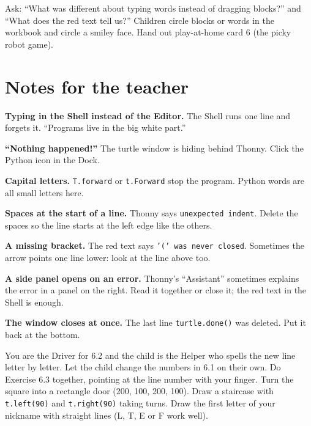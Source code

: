 \begin{reflection}
Ask: \enquote{What was different about typing words instead of dragging blocks?} and \enquote{What does the red text tell us?} Children circle blocks or words in the workbook and circle a smiley face. Hand out play-at-home card 6 (the picky robot game).
\end{reflection}

\section{Notes for the teacher}
\begin{commonmistakes}
  \item \textbf{Typing in the Shell instead of the Editor.} The Shell runs one line and forgets it. \enquote{Programs live in the big white part.}
  \item \textbf{\enquote{Nothing happened!}} The turtle window is hiding behind Thonny. Click the Python icon in the Dock.
  \item \textbf{Capital letters.} \texttt{T.forward} or \texttt{t.Forward} stop the program. Python words are all small letters here.
  \item \textbf{Spaces at the start of a line.} Thonny says \texttt{unexpected indent}. Delete the spaces so the line starts at the left edge like the others.
  \item \textbf{A missing bracket.} The red text says \texttt{'(' was never closed}. Sometimes the arrow points one line lower: look at the line above too.
  \item \textbf{A side panel opens on an error.} Thonny's \enquote{Assistant} sometimes explains the error in a panel on the right. Read it together or close it; the red text in the Shell is enough.
  \item \textbf{The window closes at once.} The last line \texttt{turtle.done()} was deleted. Put it back at the bottom.
\end{commonmistakes}

\begin{differentiation}
\supportpath You are the Driver for 6.2 and the child is the Helper who spells the new line letter by letter. Let the child change the numbers in 6.1 on their own. Do Exercise 6.3 together, pointing at the line number with your finger.
\extensionpath Turn the square into a rectangle door (200, 100, 200, 100). Draw a staircase with \texttt{t.left(90)} and \texttt{t.right(90)} taking turns. Draw the first letter of your nickname with straight lines (L, T, E or F work well).
\end{differentiation}

